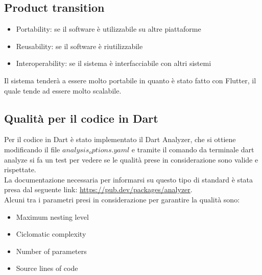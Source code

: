 \documentclass{article}
\begin{document}
\subsection{Product transition}
\begin{itemize}
    \item Portability: se il software è utilizzabile su altre piattaforme
    \item Reusability: se il software è riutilizzabile
    \item Interoperability: se il sistema è interfacciabile con altri sistemi
\end{itemize}
Il sistema tenderà a essere molto portabile in quanto è stato fatto con Flutter, il quale
tende ad essere molto scalabile.

\subsection{Qualità per il codice in Dart}
Per il codice in Dart è stato implementato il Dart Analyzer, che si ottiene modificando il file
$analysis_options.yaml$ e tramite il comando da terminale dart analyze si fa un test per 
vedere se le qualità prese in considerazione sono valide e rispettate.
\\La documentazione necessaria per informarsi su questo tipo di standard è stata presa
dal seguente link: \url{https://pub.dev/packages/analyzer}.
\\Alcuni tra i parametri presi in considerazione per garantire la qualità sono:

\begin{itemize}
    \item Maximum nesting level
    \item Ciclomatic complexity
    \item Number of parameters
    \item Source lines of code
\end{itemize}
\end{document}
